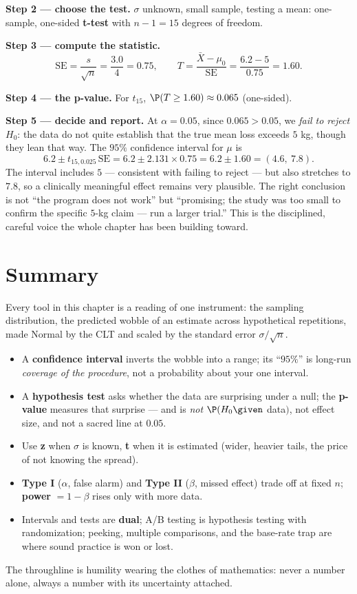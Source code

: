 \textbf{Step 2 --- choose the test.} $\sigma$ unknown, small sample, testing a mean:
one-sample, one-sided \textbf{t-test} with $n-1 = 15$ degrees of freedom.

\textbf{Step 3 --- compute the statistic.}
\[
  \mathrm{SE} = \frac{s}{\sqrt n} = \frac{3.0}{4} = 0.75,\qquad
  T = \frac{\bar X - \mu_0}{\mathrm{SE}} = \frac{6.2 - 5}{0.75} = 1.60.
\]

\textbf{Step 4 --- the p-value.} For $t_{15}$, $\P(T \ge 1.60) \approx 0.065$ (one-sided).

\textbf{Step 5 --- decide and report.} At $\alpha=0.05$, since $0.065 > 0.05$,
we \emph{fail to reject} $H_0$: the data do not quite establish that the true mean loss
exceeds $5$ kg, though they lean that way. The $95\%$ confidence interval for $\mu$ is
\[
  6.2 \pm t_{15,0.025}\,\mathrm{SE} = 6.2 \pm 2.131 \times 0.75 = 6.2 \pm 1.60 = (4.6,\ 7.8).
\]
The interval includes $5$ --- consistent with failing to reject --- but also stretches
to $7.8$, so a clinically meaningful effect remains very plausible. The right conclusion
is not ``the program does not work'' but ``promising; the study was too small to confirm
the specific $5$-kg claim --- run a larger trial.'' This is the disciplined, careful
voice the whole chapter has been building toward.

\section{Summary}
\label{ch32:summary}

\begin{aestheticbox}
Every tool in this chapter is a reading of one instrument: the sampling distribution,
the predicted wobble of an estimate across hypothetical repetitions, made Normal by the
CLT and scaled by the standard error $\sigma/\sqrt n$.
\begin{itemize}
  \item A \textbf{confidence interval} inverts the wobble into a range; its ``$95\%$'' is
  long-run \emph{coverage of the procedure}, not a probability about your one interval.
  \item A \textbf{hypothesis test} asks whether the data are surprising under a null; the
  \textbf{p-value} measures that surprise --- and is \emph{not} $\P(H_0\given$ data$)$,
  not effect size, and not a sacred line at $0.05$.
  \item Use \textbf{z} when $\sigma$ is known, \textbf{t} when it is estimated (wider,
  heavier tails, the price of not knowing the spread).
  \item \textbf{Type I} ($\alpha$, false alarm) and \textbf{Type II} ($\beta$, missed
  effect) trade off at fixed $n$; \textbf{power} $=1-\beta$ rises only with more data.
  \item Intervals and tests are \textbf{dual}; A/B testing is hypothesis testing with
  randomization; peeking, multiple comparisons, and the base-rate trap are where sound
  practice is won or lost.
\end{itemize}
The throughline is humility wearing the clothes of mathematics: never a number alone,
always a number with its uncertainty attached.
\end{aestheticbox}


